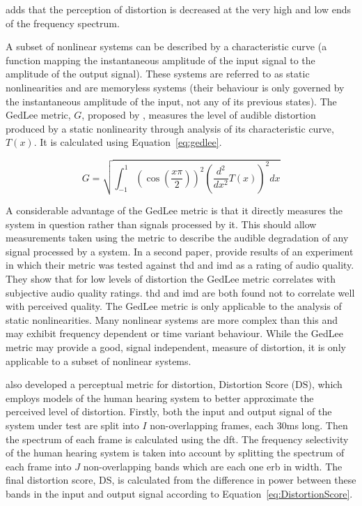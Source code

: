 			\citet{voishvillo2006assessment} adds that the perception of distortion is decreased at the very
			high and low ends of the frequency spectrum.

			A subset of nonlinear systems can be described by a characteristic curve (a function mapping the
			instantaneous amplitude of the input signal to the amplitude of the output signal). These systems
			are referred to as static nonlinearities and are memoryless systems (their behaviour is only
			governed by the instantaneous amplitude of the input, not any of its previous states). The GedLee
			metric, $G$, proposed by \citet{geddes2003auditory}, measures the level of audible distortion
			produced by a static nonlinearity through analysis of its characteristic curve, $T(x)$. It is
			calculated using Equation~\ref{eq:gedlee}.

			\begin{equation}
				G = \sqrt{\int_{-1}^{1} \left( \cos \left( \frac{x\pi}{2} \right) \right)^{2}
					      \left( \frac{d^{2}}{dx^{2}} T(x) \right)^{2} dx}
				\label{eq:gedlee}
			\end{equation}

			A considerable advantage of the GedLee metric is that it directly measures the system in question
			rather than signals processed by it. This should allow measurements taken using the metric to
			describe the audible degradation of any signal processed by a system. In a second paper,
			\citet{lee2003auditory} provide results of an experiment in which their metric was tested against
			\acrshort{thd} and \acrshort{imd} as a rating of audio quality. They show that for low levels of
			distortion the GedLee metric correlates with subjective audio quality ratings. \acrshort{thd} and
			\acrshort{imd} are both found not to correlate well with perceived quality. The GedLee metric is
			only applicable to the analysis of static nonlinearities. Many nonlinear systems are more complex
			than this and may exhibit frequency dependent or time variant behaviour. While the GedLee metric
			may provide a good, signal independent, measure of distortion, it is only applicable to a subset of
			nonlinear systems.

			\citet{tan2003the} also developed a perceptual metric for distortion, Distortion Score
			($\mathrm{DS}$), which employs models of the human hearing system to better approximate the
			perceived level of distortion. Firstly, both the input and output signal of the system under test
			are split into $I$ non-overlapping frames, each 30ms long. Then the spectrum of each frame is
			calculated using the \acrshort{dft}. The frequency selectivity of the human hearing system is taken
			into account by splitting the spectrum of each frame into $J$ non-overlapping bands which are each
			one \acrshort{erb} in width. The final distortion score, $\mathrm{DS}$, is calculated from the
			difference in power between these bands in the input and output signal according to
			Equation~\ref{eq:DistortionScore}.


